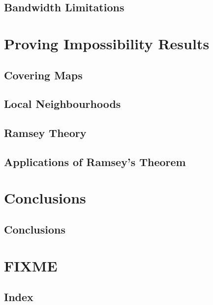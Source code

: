 \chapter{Bandwidth Limitations}


\part{Proving Impossibility Results}

\chapter{Covering Maps}


\chapter{Local Neighbourhoods}


\chapter{Ramsey Theory}


\chapter{Applications of Ramsey's Theorem}


\part{Conclusions}

\chapter{Conclusions}


\part{FIXME}


\backmatter

\chapter{Index}


\renewcommand{\bibsection}{\chapter{\bibname}}




